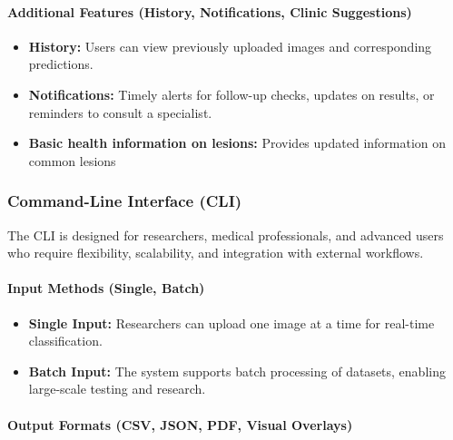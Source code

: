 \documentclass[
  12pt,
  oneside]{article}
\providecommand{\tightlist}{%
  \setlength{\itemsep}{0pt}\setlength{\parskip}{0pt}}
\begin{document}
\paragraph{Additional Features (History, Notifications, Clinic
Suggestions)}\label{additional-features-history-notifications-clinic-suggestions}

\begin{itemize}
\tightlist
\item
  \textbf{History:} Users can view previously uploaded images and
  corresponding predictions.\\
\item
  \textbf{Notifications:} Timely alerts for follow-up checks, updates on
  results, or reminders to consult a specialist.\\
\item
  \textbf{Basic health information on lesions:} Provides updated
  information on common lesions
\end{itemize}

\subsubsection{Command-Line Interface
(CLI)}\label{command-line-interface-cli}

The CLI is designed for researchers, medical professionals, and advanced
users who require flexibility, scalability, and integration with
external workflows.

\paragraph{Input Methods (Single,
Batch)}\label{input-methods-single-batch}

\begin{itemize}
\tightlist
\item
  \textbf{Single Input:} Researchers can upload one image at a time for
  real-time classification.\\
\item
  \textbf{Batch Input:} The system supports batch processing of
  datasets, enabling large-scale testing and research.
\end{itemize}

\paragraph{Output Formats (CSV, JSON, PDF, Visual
Overlays)}\label{output-formats-csv-json-pdf-visual-overlays}
\end{document}
